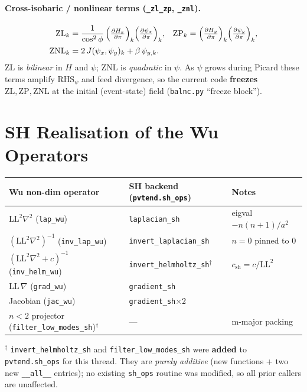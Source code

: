 \paragraph{Cross-isobaric / nonlinear terms (\texttt{\_zl\_zp}, \texttt{\_znl}).}
\begin{align}
\mathrm{ZL}_k &= \frac{1}{\cos^2\phi}\,
   \Bigl(\tfrac{\partial H_x}{\partial\pi}\Bigr)_k
   \Bigl(\tfrac{\partial\psi_x}{\partial\pi}\Bigr)_k, &
\mathrm{ZP}_k &= \Bigl(\tfrac{\partial H_y}{\partial\pi}\Bigr)_k
   \Bigl(\tfrac{\partial\psi_y}{\partial\pi}\Bigr)_k, \\
\mathrm{ZNL}_k &= 2\,J(\psi_x,\psi_y)_k + \beta\,\psi_{y,k}.
\end{align}
$\mathrm{ZL}$ is \emph{bilinear} in $H$ and $\psi$; $\mathrm{ZNL}$ is
\emph{quadratic} in $\psi$.  As $\psi$ grows during Picard these terms
amplify $\text{RHS}_\psi$ and feed divergence, so the current code
\textbf{freezes} $\mathrm{ZL},\mathrm{ZP},\mathrm{ZNL}$ at the initial
(event-state) field (\texttt{balnc.py} ``freeze block'').

\section{SH Realisation of the Wu Operators}
\label{sec:wu_sh_ops}

\begin{center}\small
\begin{tabular}{lll}
\toprule
Wu non-dim operator & SH backend (\texttt{pvtend.sh\_ops}) & Notes \\
\midrule
$\mathrm{LL}^2\nabla^2$ (\texttt{lap\_wu})       & \texttt{laplacian\_sh}        & eigval $-n(n{+}1)/a^2$ \\
$(\mathrm{LL}^2\nabla^2)^{-1}$ (\texttt{inv\_lap\_wu}) & \texttt{invert\_laplacian\_sh} & $n{=}0$ pinned to 0 \\
$(\mathrm{LL}^2\nabla^2{+}c)^{-1}$ (\texttt{inv\_helm\_wu}) & \texttt{invert\_helmholtz\_sh}$^\dagger$ & $c_{\text{sh}}{=}c/\mathrm{LL}^2$ \\
$\mathrm{LL}\,\nabla$ (\texttt{grad\_wu})        & \texttt{gradient\_sh}         & \\
Jacobian (\texttt{jac\_wu})                      & \texttt{gradient\_sh}$\times$2 & \\
$n<2$ projector (\texttt{filter\_low\_modes\_sh})$^\dagger$ & --- & m-major packing \\
\bottomrule
\end{tabular}
\end{center}
\noindent$^\dagger$ \texttt{invert\_helmholtz\_sh} and
\texttt{filter\_low\_modes\_sh} were \textbf{added} to
\texttt{pvtend.sh\_ops} for this thread.  They are \emph{purely
additive} (new functions + two new \texttt{\_\_all\_\_} entries); no
existing \texttt{sh\_ops} routine was modified, so all prior callers are
unaffected.

